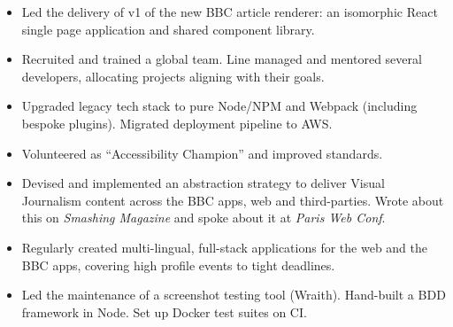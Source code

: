 \documentclass[10pt,a4paper,ragged2e,withhyper]{altacv}
\begin{document}
\begin{paracol}{2}
\divider

\begin{itemize}
    \item Led the delivery of v1 of the new BBC article renderer: an isomorphic React single page application and shared component library.
\end{itemize}

\divider


\begin{itemize}
    \item Recruited and trained a global team. Line managed and mentored several developers, allocating projects aligning with their goals.
    \item Upgraded legacy tech stack to pure Node/NPM and Webpack (including bespoke plugins). Migrated deployment pipeline to AWS.
    \item Volunteered as ``Accessibility Champion'' and improved standards.
\end{itemize}

\divider


\begin{itemize}
    \item Devised and implemented an abstraction strategy to deliver Visual Journalism content across the BBC apps, web and third-parties. Wrote about this on \emph{Smashing Magazine} and spoke about it at \emph{Paris Web Conf}.
    \item Regularly created multi-lingual, full-stack applications for the web and the BBC apps, covering high profile events to tight deadlines.
\end{itemize}



\begin{itemize}
    \item Led the maintenance of a screenshot testing tool (Wraith). Hand-built a BDD framework in Node. Set up Docker test suites on CI.
\end{itemize}

\divider


\end{paracol}
\end{document}
